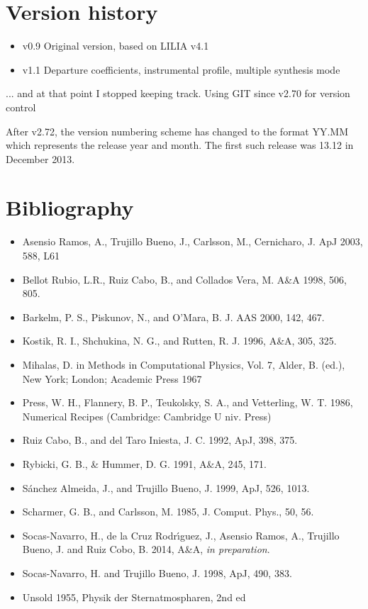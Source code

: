 \chapter{Version history}

\begin{itemize}
\item v0.9 Original version, based on LILIA v4.1
\item v1.1  Departure coefficients, instrumental profile, multiple
  synthesis mode
\end{itemize}

... and at that point I stopped keeping track. Using GIT since v2.70
for version control

After v2.72, the version numbering scheme has changed to the format
YY.MM which represents the release year and month. The first such
release was 13.12 in December 2013.

\chapter{Bibliography}

\begin{itemize}
\item Asensio Ramos, A., Trujillo Bueno, J., Carlsson, M., Cernicharo,
  J. ApJ 2003, 588, L61
\item Bellot Rubio, L.R., Ruiz Cabo, B., and Collados Vera, M. A\&A 1998, 
      506, 805.
\item Barkelm, P. S., Piskunov, N., and O'Mara, B. J. A\/AS 2000, 142, 467.
\item Kostik, R. I., Shchukina, N. G., and Rutten, R. J. 1996, 
      A\&A, 305, 325.
\item Mihalas, D. in Methods in Computational Physics, Vol. 7, Alder,
  B. (ed.), New York; London; Academic Press 1967
\item Press, W. H., Flannery, B. P., Teukolsky, S. A., and Vetterling, 
      W. T. 1986, Numerical Recipes (Cambridge: Cambridge U niv. Press)
\item Ruiz Cabo, B., and del Taro Iniesta, J. C. 1992, ApJ, 398, 375.
\item Rybicki, G. B., \& Hummer, D. G. 1991, A\&A, 245, 171.
\item S\'anchez Almeida, J., and Trujillo Bueno, J. 1999, ApJ, 526,
  1013.
\item Scharmer, G. B., and Carlsson, M. 1985, J. Comput. Phys., 50,
  56.
\item Socas-Navarro, H., de la Cruz Rodr\'\i guez, J., Asensio Ramos, A., Trujillo Bueno, J. and Ruiz Cobo, B. 2014, A\&A, {\em in preparation}.
\item Socas-Navarro, H. and Trujillo Bueno, J. 1998, ApJ, 490, 383.
\item Unsold 1955, Physik der Sternatmospharen, 2nd ed
\end{itemize}




